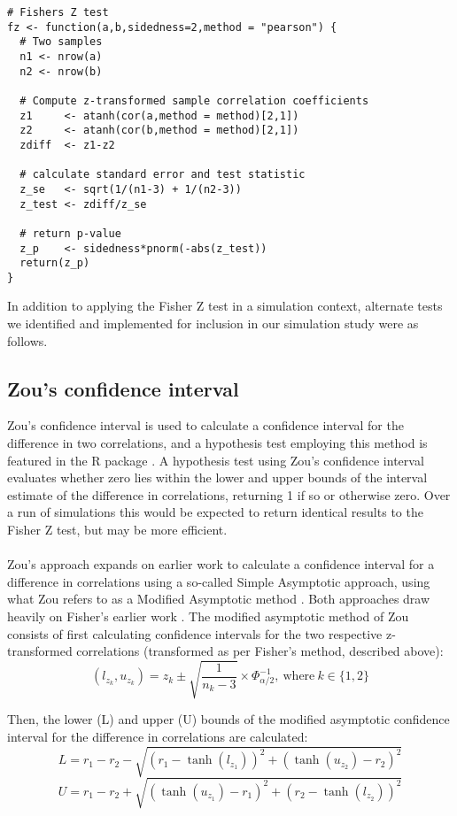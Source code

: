 \begin{lstlisting}[float=h,caption={Fisher's Z test (simulation approach)},label={lst:fz}]
# Fishers Z test
fz <- function(a,b,sidedness=2,method = "pearson") {
  # Two samples
  n1 <- nrow(a)
  n2 <- nrow(b)
   
  # Compute z-transformed sample correlation coefficients
  z1     <- atanh(cor(a,method = method)[2,1])
  z2     <- atanh(cor(b,method = method)[2,1])
  zdiff  <- z1-z2
  
  # calculate standard error and test statistic
  z_se   <- sqrt(1/(n1-3) + 1/(n2-3))
  z_test <- zdiff/z_se
  
  # return p-value
  z_p    <- sidedness*pnorm(-abs(z_test))
  return(z_p)
}
\end{lstlisting}


In addition to applying the Fisher Z test in a simulation context, alternate tests we identified and implemented for inclusion in our simulation study were as follows. 

\subsection{Zou's confidence interval}
Zou's confidence interval is used to calculate a confidence interval for the difference in two correlations, and a hypothesis test employing this method is featured in the R package  \cite{Zou2007,Diedenhofen2015}.  A hypothesis test using Zou's confidence interval evaluates whether zero lies within the lower and upper bounds of the interval estimate of the difference in correlations, returning 1 if so or otherwise zero.  Over a run of simulations this would be expected to return identical results to the Fisher Z test, but may be more efficient.
\\
\\
Zou's approach expands on earlier work \cite{Olkin1995} to calculate a confidence interval for a difference in correlations using a so-called Simple Asymptotic approach, using what Zou refers to as a Modified Asymptotic method \cite{Zou2007}.  Both approaches draw heavily on Fisher's earlier work \cite{Fisher1990}.  The modified asymptotic method of Zou consists of first calculating confidence intervals for the two respective z-transformed correlations (transformed as per Fisher's method, described above):
$$(l_{z_k}, u_{z_k}) = z_k \pm \sqrt{\frac{1}{n_k - 3}} \times \Phi_{\alpha/2}^{-1},\ \text{where} \ k \in \{1,2\}$$

Then, the lower (L) and upper (U) bounds of the modified asymptotic confidence interval for the difference in correlations are calculated:
$$L = r_1 - r_2 - \sqrt{(r_1 - \tanh(l_{z_1}))^2 + (\tanh(u_{z_2})- r_2)^2}$$
$$U = r_1 - r_2 + \sqrt{(\tanh(u_{z_1}) - r_1)^2 + (r_2 - \tanh(l_{z_2}))^2}$$

